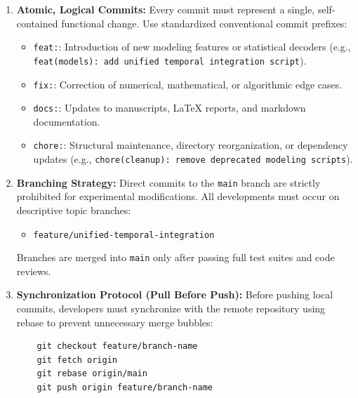 \documentclass[11pt,twoside,a4paper]{article}
\begin{document}
\begin{enumerate}
    \item \textbf{Atomic, Logical Commits:}
    Every commit must represent a single, self-contained functional change. Use standardized conventional commit prefixes:
    \begin{itemize}
        \item \texttt{feat:}: Introduction of new modeling features or statistical decoders (e.g., \texttt{feat(models): add unified temporal integration script}).
        \item \texttt{fix:}: Correction of numerical, mathematical, or algorithmic edge cases.
        \item \texttt{docs:}: Updates to manuscripts, LaTeX reports, and markdown documentation.
        \item \texttt{chore:}: Structural maintenance, directory reorganization, or dependency updates (e.g., \texttt{chore(cleanup): remove deprecated modeling scripts}).
    \end{itemize}
    
    \item \textbf{Branching Strategy:}
    Direct commits to the \texttt{main} branch are strictly prohibited for experimental modifications. All developments must occur on descriptive topic branches:
    \begin{itemize}
        \item \texttt{feature/unified-temporal-integration}
    \end{itemize}
    Branches are merged into \texttt{main} only after passing full test suites and code reviews.
    
    \item \textbf{Synchronization Protocol (Pull Before Push):}
    Before pushing local commits, developers must synchronize with the remote repository using rebase to prevent unnecessary merge bubbles:
    \begin{verbatim}
    git checkout feature/branch-name
    git fetch origin
    git rebase origin/main
    git push origin feature/branch-name
    \end{verbatim}
\end{enumerate}

\newpage

{}


\end{document}
